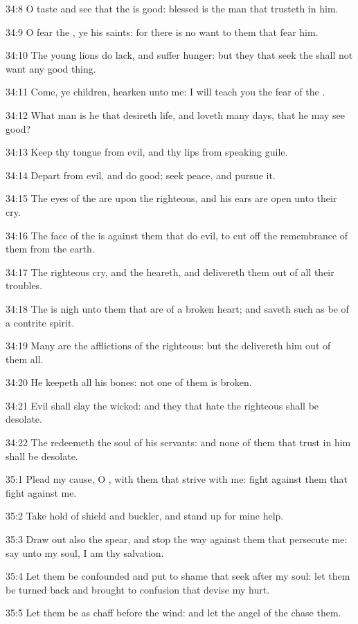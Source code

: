 34:8 O taste and see that the \LORD is good: blessed is the man that
trusteth in him.

34:9 O fear the \LORD, ye his saints: for there is no want to them that
fear him.

34:10 The young lions do lack, and suffer hunger: but they that seek
the \LORD shall not want any good thing.

34:11 Come, ye children, hearken unto me: I will teach you the fear of
the \LORD.

34:12 What man is he that desireth life, and loveth many days, that he
may see good?

34:13 Keep thy tongue from evil, and thy lips from speaking guile.

34:14 Depart from evil, and do good; seek peace, and pursue it.

34:15 The eyes of the \LORD are upon the righteous, and his ears are
open unto their cry.

34:16 The face of the \LORD is against them that do evil, to cut off
the remembrance of them from the earth.

34:17 The righteous cry, and the \LORD heareth, and delivereth them out
of all their troubles.

34:18 The \LORD is nigh unto them that are of a broken heart; and
saveth such as be of a contrite spirit.

34:19 Many are the afflictions of the righteous: but the \LORD
delivereth him out of them all.

34:20 He keepeth all his bones: not one of them is broken.

34:21 Evil shall slay the wicked: and they that hate the righteous
shall be desolate.

34:22 The \LORD redeemeth the soul of his servants: and none of them
that trust in him shall be desolate.



35:1 Plead my cause, O \LORD, with them that strive with me: fight
against them that fight against me.

35:2 Take hold of shield and buckler, and stand up for mine help.

35:3 Draw out also the spear, and stop the way against them that
persecute me: say unto my soul, I am thy salvation.

35:4 Let them be confounded and put to shame that seek after my soul:
let them be turned back and brought to confusion that devise my hurt.

35:5 Let them be as chaff before the wind: and let the angel of the
\LORD chase them.


